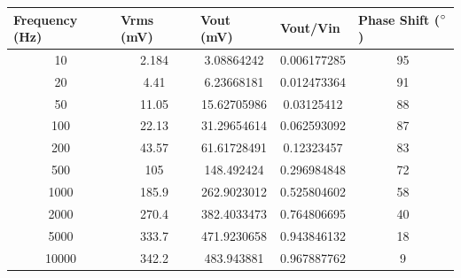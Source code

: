 \documentclass{article}
\begin{document}
\begin{itemize}
\begin{table}[h]
\begin{tabular}{ccccc}
    \multicolumn{1}{l}{\textbf{Frequency (Hz)}} & \multicolumn{1}{l}{\textbf{Vrms (mV)}} & \multicolumn{1}{l}{\textbf{Vout (mV)}} & \multicolumn{1}{l}{\textbf{Vout/Vin}} & \multicolumn{1}{l}{\textbf{Phase Shift ($\degree$)}} \\ \hline
    10                                          & 2.184                                  & 3.08864242                             & 0.006177285                           & 95                                         \\
    20                                          & 4.41                                   & 6.23668181                             & 0.012473364                           & 91                                         \\
    50                                          & 11.05                                  & 15.62705986                            & 0.03125412                            & 88                                         \\
    100                                         & 22.13                                  & 31.29654614                            & 0.062593092                           & 87                                         \\
    200                                         & 43.57                                  & 61.61728491                            & 0.12323457                            & 83                                         \\
    500                                         & 105                                    & 148.492424                             & 0.296984848                           & 72                                         \\
    1000                                        & 185.9                                  & 262.9023012                            & 0.525804602                           & 58                                         \\
    2000                                        & 270.4                                  & 382.4033473                            & 0.764806695                           & 40                                         \\
    5000                                        & 333.7                                  & 471.9230658                            & 0.943846132                           & 18                                         \\
    10000                                       & 342.2                                  & 483.943881                             & 0.967887762                           & 9                                          \\

\end{tabular}
\end{table}
\end{itemize}
\end{document}
